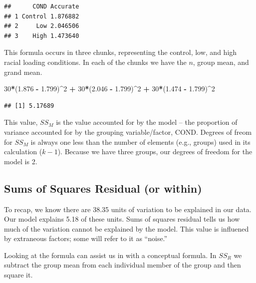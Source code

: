 \documentclass[
  english,
]{book}
\newenvironment{Shaded}{\begin{snugshade}}{\end{snugshade}}
\newcommand{\DecValTok}[1]{\textcolor[rgb]{0.00,0.00,0.81}{#1}}
\newcommand{\FloatTok}[1]{\textcolor[rgb]{0.00,0.00,0.81}{#1}}
\newcommand{\NormalTok}[1]{#1}
\newcommand{\OperatorTok}[1]{\textcolor[rgb]{0.81,0.36,0.00}{\textbf{#1}}}
\newcommand{\StringTok}[1]{\textcolor[rgb]{0.31,0.60,0.02}{#1}}
\begin{document}
\begin{verbatim}
##      COND Accurate
## 1 Control 1.876882
## 2     Low 2.046506
## 3    High 1.473640
\end{verbatim}

This formula occurs in three chunks, representing the control, low, and high racial loading conditions. In each of the chunks we have the \(n\), group mean, and grand mean.

\begin{Shaded}
\begin{Highlighting}[]
\DecValTok{30}\OperatorTok{*}\NormalTok{(}\FloatTok{1.876} \OperatorTok{-}\StringTok{ }\FloatTok{1.799}\NormalTok{)}\OperatorTok{^}\DecValTok{2} \OperatorTok{+}\StringTok{ }\DecValTok{30}\OperatorTok{*}\NormalTok{(}\FloatTok{2.046} \OperatorTok{-}\StringTok{ }\FloatTok{1.799}\NormalTok{)}\OperatorTok{^}\DecValTok{2} \OperatorTok{+}\StringTok{ }\DecValTok{30}\OperatorTok{*}\NormalTok{(}\FloatTok{1.474} \OperatorTok{-}\StringTok{ }\FloatTok{1.799}\NormalTok{)}\OperatorTok{^}\DecValTok{2}
\end{Highlighting}
\end{Shaded}

\begin{verbatim}
## [1] 5.17689
\end{verbatim}

This value, \(SS_M\) is the value accounted for by the model -- the proportion of variance accounted for by the grouping variable/factor, COND. Degrees of freom for \(SS_M\) is always one less than the number of elements (e.g., groups) used in its calculation (\(k-1\)). Because we have three groups, our degrees of freedom for the model is 2.

\hypertarget{sums-of-squares-residual-or-within}{%
\subsection{Sums of Squares Residual (or within)}\label{sums-of-squares-residual-or-within}}

To recap, we know there are 38.35 units of variation to be explained in our data. Our model explains 5.18 of these units. Sums of squares residual tells us how much of the variation cannot be explained by the model. This value is influened by extraneous factors; some will refer to it as ``noise.''

Looking at the formula can assist us in with a conceptual formula. In \(SS_R\) we subtract the group mean from each individual member of the group and then square it.
\end{document}
